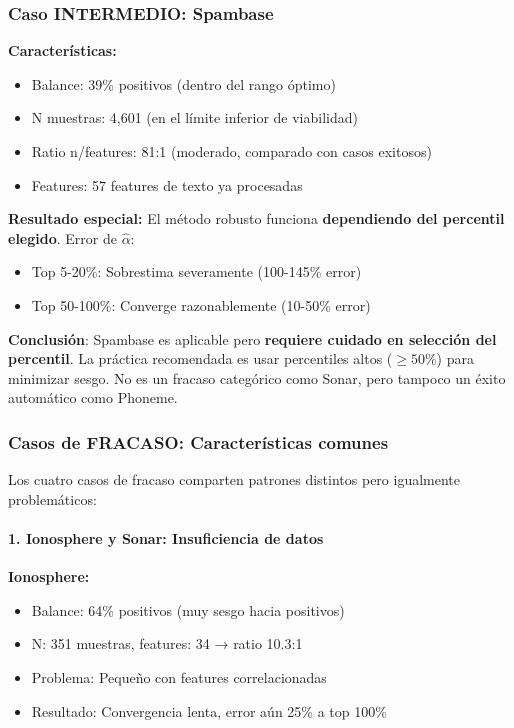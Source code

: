 \documentclass[a4paper,11pt]{article}
\begin{document}
\subsubsection{Caso INTERMEDIO: Spambase}

\textbf{Características:}
\begin{itemize}
    \item Balance: 39\% positivos (dentro del rango óptimo)
    \item N muestras: 4{,}601 (en el límite inferior de viabilidad)
    \item Ratio n/features: 81:1 (moderado, comparado con casos exitosos)
    \item Features: 57 features de texto ya procesadas
\end{itemize}

\textbf{Resultado especial:}
El método robusto funciona \textbf{dependiendo del percentil elegido}. Error de $\hat{\alpha}$:
\begin{itemize}
    \item Top 5-20\%: Sobrestima severamente (100-145\% error)
    \item Top 50-100\%: Converge razonablemente (10-50\% error)
\end{itemize}

\textbf{Conclusión}: Spambase es aplicable pero \textbf{requiere cuidado en selección del percentil}. La práctica recomendada es usar percentiles altos ($\geq 50\%$) para minimizar sesgo. No es un fracaso categórico como Sonar, pero tampoco un éxito automático como Phoneme.

\subsubsection{Casos de FRACASO: Características comunes}

Los cuatro casos de fracaso comparten patrones distintos pero igualmente problemáticos:

\paragraph{1. Ionosphere y Sonar: Insuficiencia de datos}


\textbf{Ionosphere:}
\begin{itemize}
    \item Balance: 64\% positivos (muy sesgo hacia positivos)
    \item N: 351 muestras, features: 34 → ratio 10.3:1
    \item Problema: Pequeño con features correlacionadas
    \item Resultado: Convergencia lenta, error aún 25\% a top 100\%
\end{itemize}
\end{document}
